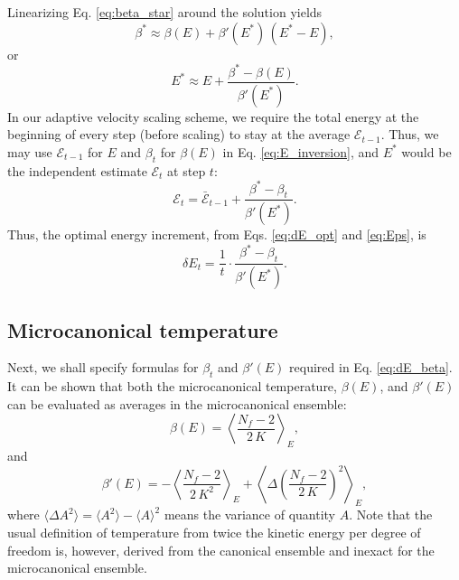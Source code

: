 \documentclass[reprint]{revtex4-1}
\begin{document}
Linearizing Eq. \eqref{eq:beta_star} around the solution
yields
%
\begin{equation*}
\beta^*
\approx
\beta( E )
+
\beta'( E^* ) \, ( E^* - E )
,
\end{equation*}
%
or
%
\begin{equation}
E^*
\approx
E
+
\frac{ \beta^* - \beta(E) }
     { \beta'(E^*) }
.
\label{eq:E_inversion}
\end{equation}
%
In our adaptive velocity scaling scheme,
we require the total energy at the beginning of every step
(before scaling) to stay at the average $\mathcal E_{t - 1}$.
%
Thus, we may use $\mathcal E_{t - 1}$ for $E$
and $\beta_t$ for $\beta(E)$
in Eq. \eqref{eq:E_inversion},
and $E^*$ would be the independent estimate
$\mathcal E_{t}$ at step $t$:
%
%
\begin{equation}
\mathcal E_t
=
\bar{\mathcal E}_{t - 1}
+
\frac{ \beta^* - \beta_t }
     { \beta'(E^*) }
.
\label{eq:Eps}
\end{equation}
%
Thus, the optimal energy increment,
from Eqs. \eqref{eq:dE_opt} and \eqref{eq:Eps},
is
%
\begin{equation}
\delta E_t
=
\frac{ 1 } { t }
\cdot
\frac{ \beta^* - \beta_t }
     { \beta'(E^*) }
.
\label{eq:dE_beta}
\end{equation}
%



\subsection{Microcanonical temperature}


Next, we shall specify formulas for $\beta_t$
and $\beta'(E)$ required in Eq. \eqref{eq:dE_beta}.
%
It can be shown that both the microcanonical temperature, $\beta(E)$,
and $\beta'(E)$ can be evaluated as
averages in the microcanonical ensemble\cite{rugh1997}:
%
\begin{equation}
  \beta(E)
  =
  \left\langle
    \frac{ N_f - 2 }
         { 2 \, K }
  \right\rangle_E
  ,
  \label{eq:betaE_invK}
\end{equation}
%
and
%
\begin{equation}
  \beta'(E)
  =
  - \left\langle
      \frac{ N_f - 2 }
           { 2 \, K^2 }
    \right\rangle_E
  + \left\langle
      \Delta\left(
        \frac{ N_f - 2 }
             { 2 \, K }
      \right)^2
    \right\rangle_E
  ,
  \label{eq:dbetadE}
\end{equation}
%
where
$\langle \Delta A^2 \rangle = \langle A^2 \rangle - \langle A \rangle^2$
means the variance of quantity $A$.
%
Note that the usual definition of temperature from twice the kinetic energy
per degree of freedom is, however,
derived from the canonical ensemble and
inexact for the microcanonical ensemble.
\end{document}
